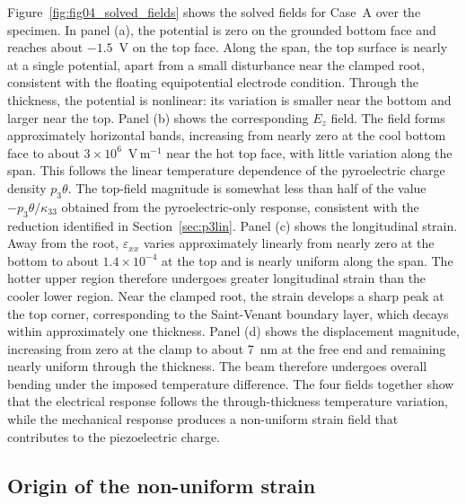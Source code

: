 \documentclass[pdflatex,sn-mathphys-num]{sn-jnl}
\begin{document}
Figure~\ref{fig:fig04_solved_fields} shows the solved fields for Case~A over the
specimen. In panel (a), the potential is zero on the grounded bottom face and reaches
about $-1.5$~V on the top face. Along the span, the top surface is nearly at a single
potential, apart from a small disturbance near the clamped root, consistent with the
floating equipotential electrode condition. Through the thickness, the potential is
nonlinear: its variation is smaller near the bottom and larger near the top. Panel
(b) shows the corresponding $E_z$ field. The field forms approximately horizontal
bands, increasing from nearly zero at the cool bottom face to about
$3\times10^{6}$~V\,m$^{-1}$ near the hot top face, with little variation along the
span. This follows the linear temperature dependence of the pyroelectric charge
density $p_3\theta$. The top-field magnitude is somewhat less than half of the value
$-p_3\theta/\kappa_{33}$ obtained from the pyroelectric-only response, consistent with
the reduction identified in Section~\ref{sec:p3lin}. Panel (c) shows the longitudinal
strain. Away from the root, $\varepsilon_{xx}$ varies approximately linearly from
nearly zero at the bottom to about $1.4\times10^{-4}$ at the top and is nearly uniform
along the span. The hotter upper region therefore undergoes greater longitudinal
strain than the cooler lower region. Near the clamped root, the strain develops a
sharp peak at the top corner, corresponding to the Saint-Venant boundary layer, which
decays within approximately one thickness. Panel (d) shows the displacement
magnitude, increasing from zero at the clamp to about 7~nm at the free end and
remaining nearly uniform through the thickness. The beam therefore undergoes overall
bending under the imposed temperature difference. The four fields together show that
the electrical response follows the through-thickness temperature variation, while
the mechanical response produces a non-uniform strain field that contributes to the
piezoelectric charge.

\subsection{Origin of the non-uniform strain}
\label{sec:clamp}
\end{document}
